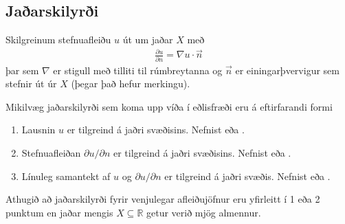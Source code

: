 \documentclass[a4paper,10pt,icelandic]{sphinxmanual}
\begin{document}
\subsection{Jaðarskilyrði}
\label{\detokenize{Kafli01:jaarskilyri}}
Skilgreinum stefnuafleiðu \(u\) út um jaðar \(X\) með
\begin{equation*}
\begin{split}\frac{\partial u}{\partial n} = \nabla u \cdot \vec n\end{split}
\end{equation*}
þar sem \(\nabla\) er stigull með tilliti til rúmbreytanna og \(\vec n\) er einingarþvervigur sem stefnir út úr \(X\) (þegar það hefur merkingu).

Mikilvæg jaðarskilyrði sem koma upp víða í eðlisfræði eru á eftirfarandi formi
\begin{enumerate}
\def\theenumi{\arabic{enumi}}
\def\labelenumi{\theenumi .}
\makeatletter\def\p@enumii{\p@enumi \theenumi .}\makeatother
\item {} 
Lausnin \(u\) er tilgreind á jaðri svæðisins. Nefnist  eða .

\item {} 
Stefnuafleiðan \(\partial u/\partial n\) er tilgreind á jaðri svæðisins. Nefnist  eða .

\item {} 
Línuleg samantekt af \(u\) og \(\partial u/\partial n\) er tilgreind á jaðri svæðis. Nefnist  eða .

\end{enumerate}

Athugið að jaðarskilyrði fyrir venjulegar afleiðujöfnur eru yfirleitt í 1 eða 2 punktum en jaðar mengis \(X \subseteq \mathbb{R}\) getur verið mjög almennur.
\end{document}
